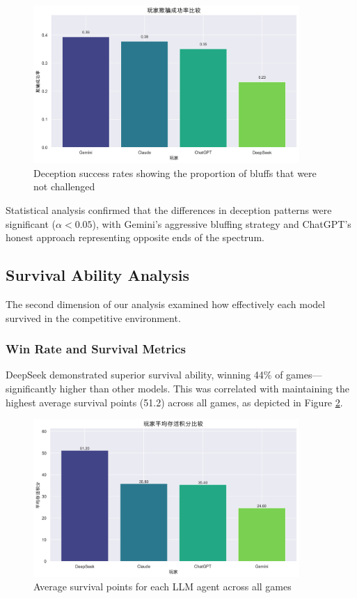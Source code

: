 \documentclass{article}
\begin{document}
\begin{figure}[H]
    \centering
    \includegraphics[width=0.9\textwidth]{figures/deception_deception_success_rate.png}
    \caption{Deception success rates showing the proportion of bluffs that were not challenged}
    \label{fig:deception_success}
\end{figure}

Statistical analysis confirmed that the differences in deception patterns were significant ($\alpha < 0.05$), with Gemini's aggressive bluffing strategy and ChatGPT's honest approach representing opposite ends of the spectrum.

\subsection{Survival Ability Analysis}
The second dimension of our analysis examined how effectively each model survived in the competitive environment.

\subsubsection{Win Rate and Survival Metrics}
DeepSeek demonstrated superior survival ability, winning 44\% of games—significantly higher than other models. This was correlated with maintaining the highest average survival points (51.2) across all games, as depicted in Figure \ref{fig:survival_points}.

\begin{figure}[H]
    \centering
    \includegraphics[width=0.9\textwidth]{figures/survival_average_survival_points.png}
    \caption{Average survival points for each LLM agent across all games}
    \label{fig:survival_points}
\end{figure}
\end{document}

